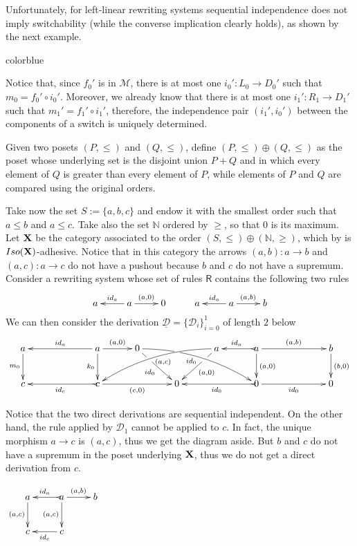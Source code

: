 \documentclass[a4paper,UKenglish,cleveref,pdftex,thm-restate,numberwithinsect,anonymous]{lipics}
\newcommand{\full}[1]{{color{blue}#1}}
\newcommand{\full}[1]{}
\newcommand{\id}[1]{\mathsf{id}_{#1}}
\def\R{\mathsf{R}}
\def\X{\textbf {\textup{X}}}
\newcommand{\dder}[1]{\mathscr{#1}}
\newcommand{\der}[1]{\underline{\dder{#1}}}
\begin{document}
Unfortunately, for left-linear rewriting systems
sequential independence does not imply switchability (while the
converse implication clearly holds), as shown by the next example.

\full{
  \begin{remark}
    \label{rem:fact}
    Notice that, since $f_0'$ is in $\mathcal{M}$, there is
    at most one $i_0' \colon L_0\to D_0'$ such that
    $m_0=f_0' \circ i_0'$. Moreover, we already know that
    there is at most one $i_1' \colon R_1\to D_1'$ such that
    $m_1'=f_1' \circ i_1'$, therefore, the
    independence pair $(i_1',i_0')$ between the components of a switch is
    uniquely determined.
  \end{remark}
}

\begin{example}
  \label{ex:diff1}
  Given two posets $(P, \leq)$ and $(Q, \leq)$, define
  $(P, \leq)\oplus(Q,\leq)$ as the poset whose underlying set is
  the disjoint union $P+Q$ and in which every element of $Q$ is
  greater than every element of $P$, while elements of $P$ and $Q$ are
  compared using the original orders.

  Take now the set $S:=\{a,b,c\}$ and endow it with the smallest order
  such that $a\leq b$ and $a\leq c$.  Take also the set $\mathbb{N}$
  ordered by $\geq$, so that $0$ is its maximum.  Let $\X$ be the
  category associated to the order
  $(S, \leq)\oplus (\mathbb{N}, \geq)$, which by  is
  $\mathsf{Iso(\X)}$-adhesive. Notice that in this category the arrows
  $(a,b)\colon a\to b$ and $(a,c)\colon a\to c$ do not have a pushout
  because $b$ and $c$ do not have a supremum.  Consider a rewriting
  system whose set of rules $\R$ contains the following two rules
  \[\xymatrix{a & a \ar[r]^{(a, 0)} \ar[l]_{\id{a}} & 0 & a & a
      \ar[r]^{(a, b)} \ar[l]_{\id{a}} & b }\]
  We can then consider the  derivation
  $\der{D}=\{\dder{D}_i\}_{i=0}^1$ of length $2$ below
  \[
    \xymatrix@C=30pt{a \ar[d]_{m_0}&& a \ar[d]_{k_0}\ar[ll]_{\id{a}}
      \ar[r]^{(a,0)} & 0 \ar@/^.35cm/[drrr]|(.315)\hole_(.45){\id{0}}
      \ar[dr]|(.3)\hole_{\id{0}} && a \ar@/_.35cm/[dlll]^(.45){(a,c)}
      \ar[dl]|(.3)\hole^{(a,0)}& a \ar[d]^{(a,0)}\ar@{>->}[l]_{\id{a}}
      \ar[rr]^{(a,b)} && b \ar[d]^{(b,0)}\\c &&
      \ar@{>->}[ll]^{\id{c}} c \ar[rr]_{(c,0)}&& 0 &&
      \ar@{>->}[ll]^{\id{0}} 0 \ar[rr]_{\id{0}}&& 0}\]

  \noindent
  \parbox{10cm}{ \hspace{15pt} Notice that the two
    direct derivations are sequential independent.
    On the other hand, the rule
    applied by $\dder{D}_1$ cannot be applied to $c$. In fact, the
    unique morphism $a\to c$ is $(a,c)$, thus we get the diagram
    aside. But $b$ and $c$ do not have a supremum in the poset
    underlying $\X$, thus we do not get a direct derivation from
    $c$.}  \parbox{3cm}{
    \vspace{-.3cm}$\xymatrix{a \ar[d]_{(a,c)}& a
      \ar[d]_{(a,c)}\ar@{>->}[l]_{\id{a}} \ar[r]^{(a,b)} & b \\c
      & c \ar[l]^{\id{c}} }$}  
\end{example}
\end{document}
